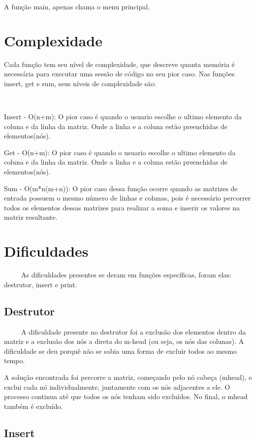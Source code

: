 \documentclass{article}
\begin{document}
A função main, apenas chama o menu principal.

\section{Complexidade}

Cada função tem seu nível de complexidade, que descreve quanta memória é necessária para executar uma sessão de código no seu pior caso. Nas funções insert, get e sum, seus níveis de complexidade são:

~~~~~~~~~~~~~~~~~~~~~~

Insert - O(n+m): O pior caso é quando o usuario escolhe o ultimo elemento da coluna e da linha da matriz. Onde a linha e a coluna estão preenchidas de elementos(nós).

Get - O(n+m): O pior caso é quando o usuario escolhe o ultimo elemento da coluna e da linha da matriz. Onde a linha e a coluna estão preenchidas de elementos(nós).

Sum - O(m*n(m+n)): O pior caso dessa função ocorre quando as matrizes de entrada possuem o mesmo número de linhas e colunas, pois é necessário percorrer todos os elementos dessas matrizes para realizar a soma e inserir os valores na matriz resultante.

\section{Dificuldades}

~~~~~As dificuldades presentes se deram em funções específicas, foram elas: destrutor, insert e print.

\subsection{Destrutor}

~~~~~A dificuldade presente no destrutor foi a exclusão dos elementos dentro da matriz e a exclusão dos nós a direta do m-head (ou seja, os nós das colunas). A dificuldade se deu porquê não se sabia uma forma de excluir todos ao mesmo tempo.

A solução encontrada foi percorre a matriz, começando pelo nó cabeça (mhead), e exclui cada nó individualmente, juntamente com os nós adjacentes a ele. O processo continua até que todos os nós tenham sido excluídos. No final, o mhead também é excluído.

\subsection{Insert}
\end{document}
